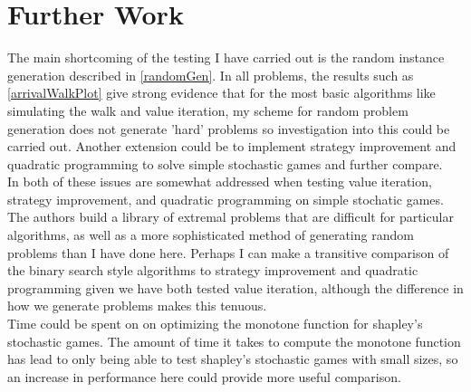 \section{Further Work}
The main shortcoming of the testing I have carried out is the random instance generation described in \cref{randomGen}.
In all problems, the results such as \cref{arrivalWalkPlot} give strong evidence
that for the most basic algorithms like simulating the walk and value iteration,
my scheme for random problem generation does not generate 'hard' problems so investigation
into this could be carried out. Another extension
could be to implement strategy improvement and quadratic programming
to solve simple stochastic games and further compare.\\
In \citep{valueIterationTest} both of these issues are somewhat addressed when testing value iteration,
strategy improvement, and quadratic programming on simple stochatic games. The authors
build a library of extremal problems that are difficult for particular algorithms, as well as a more
sophisticated method of generating random problems than I have done here. Perhaps I can make a transitive
comparison of the binary search style algorithms to strategy improvement and quadratic programming given
we have both tested value iteration, although the difference in how we generate problems makes this tenuous. \\
Time could be spent on on optimizing the monotone function for shapley's stochastic games. 
The amount of time it takes to compute the monotone function has lead to only being able to test
shapley's stochastic games with small sizes, so an increase in performance here could provide
more useful comparison.

